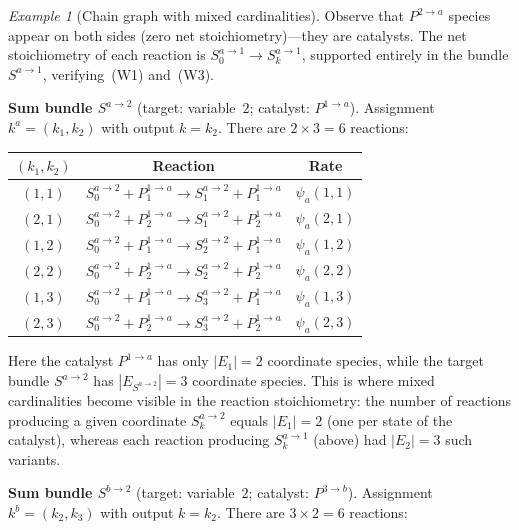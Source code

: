 \documentclass{article}
\theoremstyle{plain}
\theoremstyle{definition}
\theoremstyle{remark}
\newtheorem{example}{Example}[section]
\newcommand{\<}{\langle}
\renewcommand{\>}{\rangle}
\begin{document}
\begin{example}[Chain graph with mixed cardinalities]
\noindent
Observe that $P^{2\to a}$ species appear on both sides (zero net
stoichiometry)---they are catalysts.  The net stoichiometry of each
reaction is $S^{a\to 1}_0 \to S^{a\to 1}_k$, supported entirely
in the bundle $S^{a\to 1}$, verifying~(W1) and~(W3).
 
\smallskip
\noindent\textbf{Sum bundle $S^{a\to 2}$}
(target: variable~$2$; catalyst: $P^{1\to a}$).
Assignment $k^a=(k_1,k_2)$ with output $k=k_2$.
There are $2\times 3 = 6$ reactions:
 
\begin{center}
\renewcommand{\arraystretch}{1.3}
\begin{tabular}{@{}ccc@{}}
\toprule
$(k_1,k_2)$ & Reaction & Rate \\
\midrule
$(1,1)$ & $S^{a\to 2}_0 + P^{1\to a}_1 \to S^{a\to 2}_1 + P^{1\to a}_1$ & $\psi_a(1,1)$ \\
$(2,1)$ & $S^{a\to 2}_0 + P^{1\to a}_2 \to S^{a\to 2}_1 + P^{1\to a}_2$ & $\psi_a(2,1)$ \\
$(1,2)$ & $S^{a\to 2}_0 + P^{1\to a}_1 \to S^{a\to 2}_2 + P^{1\to a}_1$ & $\psi_a(1,2)$ \\
$(2,2)$ & $S^{a\to 2}_0 + P^{1\to a}_2 \to S^{a\to 2}_2 + P^{1\to a}_2$ & $\psi_a(2,2)$ \\
$(1,3)$ & $S^{a\to 2}_0 + P^{1\to a}_1 \to S^{a\to 2}_3 + P^{1\to a}_1$ & $\psi_a(1,3)$ \\
$(2,3)$ & $S^{a\to 2}_0 + P^{1\to a}_2 \to S^{a\to 2}_3 + P^{1\to a}_2$ & $\psi_a(2,3)$ \\
\bottomrule
\end{tabular}
\end{center}
 
\noindent
Here the catalyst $P^{1\to a}$ has only $|E_1|=2$ coordinate species,
while the target bundle $S^{a\to 2}$ has $|E_{S^{a\to 2}}|=3$
coordinate species.
This is where mixed cardinalities become visible in the reaction
stoichiometry: the number of reactions producing a given coordinate
$S^{a\to 2}_k$ equals $|E_1|=2$ (one per state of the catalyst),
whereas each reaction producing $S^{a\to 1}_k$ (above) had $|E_2|=3$
such variants.
 
\smallskip
\noindent\textbf{Sum bundle $S^{b\to 2}$}
(target: variable~$2$; catalyst: $P^{3\to b}$).
Assignment $k^b=(k_2,k_3)$ with output $k=k_2$.
There are $3\times 2 = 6$ reactions:
 

\end{example}
\end{document}
